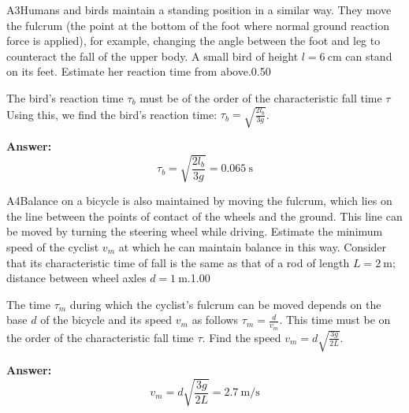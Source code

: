 \documentclass[11pt,a4paper]{article}
\begin{document}
\begin{solcard}{A3}{Humans and birds maintain a standing position in a similar way. They move the fulcrum (the point at the bottom of the foot where normal ground reaction force is applied), for example, changing the angle between the foot and leg to counteract the fall of the upper body. A small bird of height $l=6~\text{cm}$ can stand on its feet. Estimate her reaction time from above.}{0.50}

The bird's reaction time $\tau_b$ must be of the order of the characteristic fall time $\tau$ Using this, we find the bird's reaction time: $\tau_b=\sqrt{\frac{2 l_b}{3 g}}$.

\par\smallskip\noindent\textbf{Answer:} \[\tau_b=\sqrt{\frac{2 l_b}{3 g}}=0.065~\text{s}\]
\end{solcard}

\begin{solcard}{A4}{Balance on a bicycle is also maintained by moving the fulcrum, which lies on the line between the points of contact of the wheels and the ground. This line can be moved by turning the steering wheel while driving. Estimate the minimum speed of the cyclist $v_m$ at which he can maintain balance in this way. Consider that its characteristic time of fall is the same as that of a rod of length $L=2~\text{m}$; distance between wheel axles $d=1~\text{m}$.}{1.00}

The time $\tau_m$ during which the cyclist’s fulcrum can be moved depends on the base $d$ of the bicycle and its speed $v_m$ as follows $\tau_m=\frac{d}{v_m}$. This time must be on the order of the characteristic fall time $\tau$. Find the speed $v_m=d\sqrt{\frac{3g}{2L}}$.

\par\smallskip\noindent\textbf{Answer:} \[v_m=d\sqrt{\frac{3g}{2L}}=2.7~\text{m}/\text{s}\]
\end{solcard}
\end{document}
